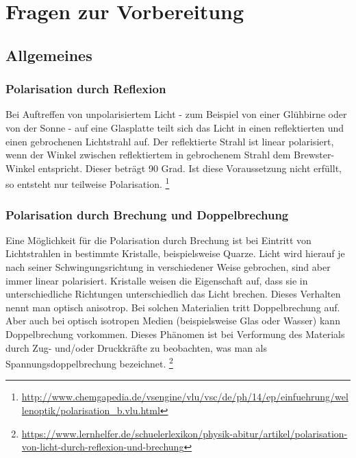 

\chapter{Fragen zur Vorbereitung}
\label{chap:fvz}


\section{Allgemeines}

\subsection*{Polarisation durch Reflexion}
Bei Auftreffen von unpolarisiertem Licht - zum Beispiel von einer Glühbirne oder von der Sonne - auf eine Glasplatte teilt sich das Licht in einen reflektierten und einen gebrochenen Lichtstrahl auf. 
Der reflektierte Strahl ist  linear polarisiert, wenn der Winkel zwischen reflektiertem in gebrochenem Strahl dem Brewster-Winkel entspricht. Dieser beträgt 90 Grad. Ist diese Voraussetzung nicht erfüllt, so entsteht nur teilweise Polarisation. 
\footnote{\url{http://www.chemgapedia.de/vsengine/vlu/vsc/de/ph/14/ep/einfuehrung/wellenoptik/polarisation_b.vlu.html}}

\subsection*{Polarisation durch Brechung und Doppelbrechung}
Eine Möglichkeit für die Polarisation durch Brechung ist bei Eintritt von Lichtstrahlen in bestimmte Kristalle, beispielsweise Quarze. Licht wird hierauf je nach seiner Schwingungsrichtung in verschiedener Weise gebrochen, sind aber immer linear polarisiert. 
Kristalle weisen die Eigenschaft auf, dass sie in unterschiedliche Richtungen unterschiedlich das Licht brechen. Dieses Verhalten nennt man optisch anisotrop. Bei solchen Materialien tritt Doppelbrechung auf. Aber auch bei optisch isotropen Medien (beispielsweise Glas oder Wasser) kann Doppelbrechung vorkommen. Dieses Phänomen ist  bei Verformung des Materials durch Zug- und/oder Druckkräfte zu beobachten, was man als Spannungsdoppelbrechung bezeichnet. 
\footnote{\url{https://www.lernhelfer.de/schuelerlexikon/physik-abitur/artikel/polarisation-von-licht-durch-reflexion-und-brechung}}
\newpage
